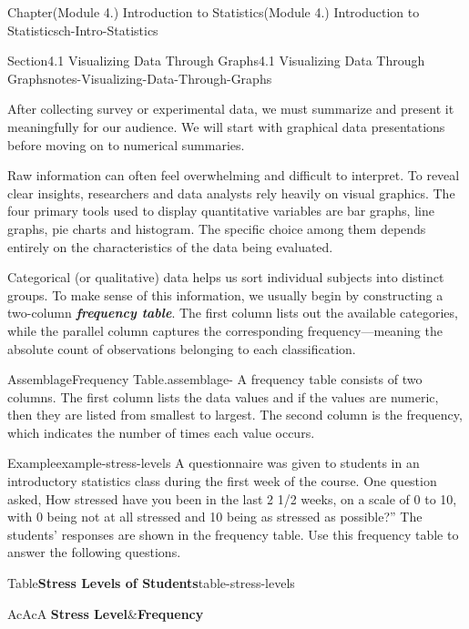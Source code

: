 \documentclass[oneside,10pt,]{book}
\newcommand{\tabularfont}{\relax}
\newcommand{\alert}[1]{\textbf{\textit{#1}}}
\newcommand{\hrulethin}  {\noalign{\hrule height 0.04em}}
\begin{document}
\begin{chapterptx}{Chapter}{(Module 4.) Introduction to Statistics}{}{(Module 4.) Introduction to Statistics}{}{}{ch-Intro-Statistics}
%
\begin{sectionptx}{Section}{4.1 Visualizing Data Through Graphs}{}{4.1 Visualizing Data Through Graphs}{}{}{notes-Visualizing-Data-Through-Graphs}
\begin{introduction}{}%
After collecting survey or experimental data, we must summarize and present it meaningfully for our audience. We will start with graphical data presentations before moving on to numerical summaries.%
\par
Raw information can often feel overwhelming and difficult to interpret. To reveal clear insights, researchers and data analysts rely heavily on visual graphics. The four primary tools used to display quantitative variables are bar graphs, line graphs, pie charts and histogram. The specific choice among them depends entirely on the characteristics of the data being evaluated.%
\par
Categorical (or qualitative) data helps us sort individual subjects into distinct groups. To make sense of this information, we usually begin by constructing a two-column \alert{frequency table}. The first column lists out the available categories, while the parallel column captures the corresponding frequency—meaning the absolute count of observations belonging to each classification.%
\end{introduction}%
\begin{assemblage}{Assemblage}{Frequency Table.}{assemblage-}%
A frequency table consists of two columns. The first column lists the data values and if the values are numeric, then they are listed from smallest to largest. The second column is the frequency, which indicates the number of times each value occurs.%
\end{assemblage}
\begin{example}{Example}{}{example-stress-levels}%
A questionnaire was given to students in an introductory statistics class during the first week of the course. One question asked, \textasciigrave{}\textasciigrave{}How stressed have you been in the last 2 1\slash{}2 weeks, on a scale of 0 to 10, with 0 being not at all stressed and 10 being as stressed as possible?” The students' responses are shown in the frequency table. Use this frequency table to answer the following questions.%
\begin{tableptx}{Table}{\textbf{Stress Levels of Students}}{table-stress-levels}{}%
\centering%
{\tabularfont%
\begin{tabular}{AcAcA}\hrulethin
{\bfseries{}Stress Level}&{\bfseries{}Frequency}\tabularnewline\hrulethin

\end{tabular}}
\end{tableptx}
\end{example}
\end{sectionptx}
\end{chapterptx}
\end{document}
